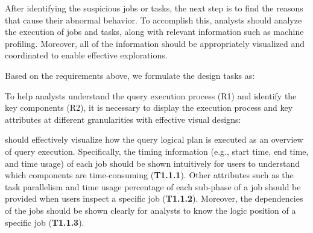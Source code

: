 After identifying the suspicious jobs or tasks, the next step is to find the reasons that cause their abnormal behavior.
To accomplish this, analysts should analyze the execution of jobs and tasks, along with relevant information such as machine profiling. Moreover, all of the information should be appropriately visualized and coordinated to enable effective explorations.


Based on the requirements above, we formulate the design tasks as:

To help analysts understand the query execution process (R1) and identify the key components (R2), it is necessary to display the execution process and key attributes at different granularities with effective visual designs:
\squishlist
\item[\textbf{T1.1}] 
\qevis{} should effectively visualize how the query logical plan is executed as an overview of query execution.
Specifically, the timing information (e.g., start time, end time, and time usage) of each job should be shown intuitively for users to understand which components are time-consuming (\textbf{T1.1.1}).
Other attributes such as the task parallelism and time usage percentage of each sub-phase of a job should be provided when users inspect a specific job (\textbf{T1.1.2}).
Moreover, the dependencies of the jobs should be shown clearly for analysts to know the logic position of a specific job (\textbf{T1.1.3}).

\squishend

